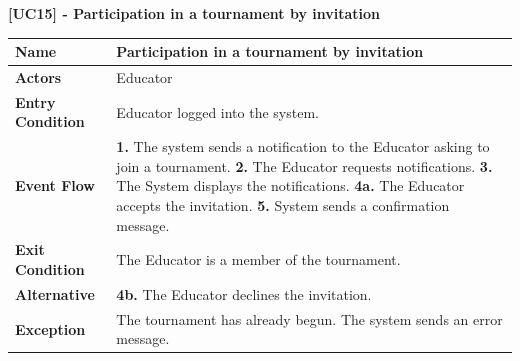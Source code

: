 \clearpage
\raggedright
\textbf{[UC15] - Participation in a tournament by invitation}
\begin{table}[h]
\begin{tabular}{|l|p{12cm}|} \hline 

\rule[-3mm]{0mm}{1cm}
\textbf{Name} &  Participation in a tournament by invitation \\ \hline 

\rule[-3mm]{0mm}{1cm}
\textbf{Actors} & Educator \\ \hline 

\rule[-3mm]{0mm}{1cm}
\textbf{Entry Condition} & Educator logged into the system.
\vspace{2pt}
\\ \hline 

\rule[-3mm]{0mm}{1cm}
\textbf{Event Flow} & 
\textbf{1.} The system sends a notification to the Educator asking to join a tournament.
\vspace{4pt}
\newline
\textbf{2.} The Educator requests notifications.
\vspace{4pt}
\newline
\textbf{3.} The System displays the notifications.
\vspace{4pt}
\newline
\textbf{4a.} The Educator accepts the invitation.
\vspace{4pt}
\newline
\textbf{5.} System sends a confirmation message. 

\\\hline 


\rule[-3mm]{0mm}{1cm}
\textbf{Exit Condition} & The Educator is a member of the tournament. \\ \hline

\rule[-3mm]{0mm}{1cm}
\textbf{Alternative} & \textbf{4b.} The Educator declines the invitation. \\ \hline

\rule[-3mm]{0mm}{1cm}
\textbf{Exception} & The tournament has already begun. The system sends an error message. \\ \hline

\end{tabular}
\end{table}

